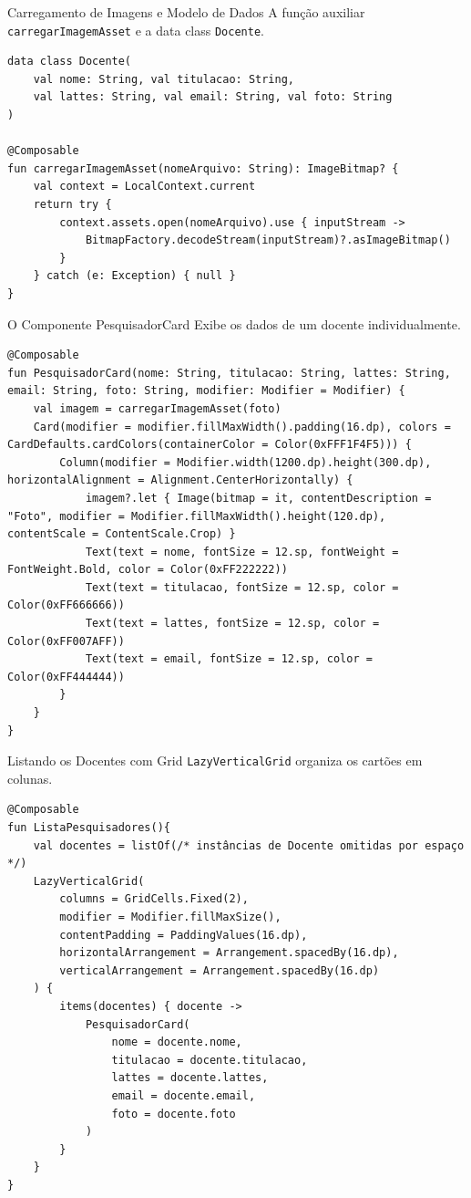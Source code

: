 \documentclass[aspectratio=169]{beamer}
\begin{document}
\begin{frame}[fragile]{Carregamento de Imagens e Modelo de Dados}
  A função auxiliar \texttt{carregarImagemAsset} e a data class \texttt{Docente}.
  \begin{lstlisting}[style=KotlinStyle]
data class Docente(
    val nome: String, val titulacao: String,
    val lattes: String, val email: String, val foto: String
)

@Composable
fun carregarImagemAsset(nomeArquivo: String): ImageBitmap? {
    val context = LocalContext.current
    return try {
        context.assets.open(nomeArquivo).use { inputStream ->
            BitmapFactory.decodeStream(inputStream)?.asImageBitmap()
        }
    } catch (e: Exception) { null }
}
  \end{lstlisting}
\end{frame}

\begin{frame}[fragile]{O Componente PesquisadorCard}
  Exibe os dados de um docente individualmente.
  \begin{lstlisting}[style=KotlinStyle, basicstyle=\ttfamily\tiny]
@Composable
fun PesquisadorCard(nome: String, titulacao: String, lattes: String, email: String, foto: String, modifier: Modifier = Modifier) {
    val imagem = carregarImagemAsset(foto)
    Card(modifier = modifier.fillMaxWidth().padding(16.dp), colors = CardDefaults.cardColors(containerColor = Color(0xFFF1F4F5))) {
        Column(modifier = Modifier.width(1200.dp).height(300.dp), horizontalAlignment = Alignment.CenterHorizontally) {
            imagem?.let { Image(bitmap = it, contentDescription = "Foto", modifier = Modifier.fillMaxWidth().height(120.dp), contentScale = ContentScale.Crop) }
            Text(text = nome, fontSize = 12.sp, fontWeight = FontWeight.Bold, color = Color(0xFF222222))
            Text(text = titulacao, fontSize = 12.sp, color = Color(0xFF666666))
            Text(text = lattes, fontSize = 12.sp, color = Color(0xFF007AFF))
            Text(text = email, fontSize = 12.sp, color = Color(0xFF444444))
        }
    }
}
  \end{lstlisting}
\end{frame}

\begin{frame}[fragile]{Listando os Docentes com Grid}
  \texttt{LazyVerticalGrid} organiza os cartões em colunas.
  \begin{lstlisting}[style=KotlinStyle, basicstyle=\ttfamily\tiny]
@Composable
fun ListaPesquisadores(){
    val docentes = listOf(/* instâncias de Docente omitidas por espaço */)
    LazyVerticalGrid(
        columns = GridCells.Fixed(2),
        modifier = Modifier.fillMaxSize(),
        contentPadding = PaddingValues(16.dp),
        horizontalArrangement = Arrangement.spacedBy(16.dp),
        verticalArrangement = Arrangement.spacedBy(16.dp)
    ) {
        items(docentes) { docente ->
            PesquisadorCard(
                nome = docente.nome,
                titulacao = docente.titulacao,
                lattes = docente.lattes,
                email = docente.email,
                foto = docente.foto
            )
        }
    }
}
  \end{lstlisting}
\end{frame}
\end{document}
